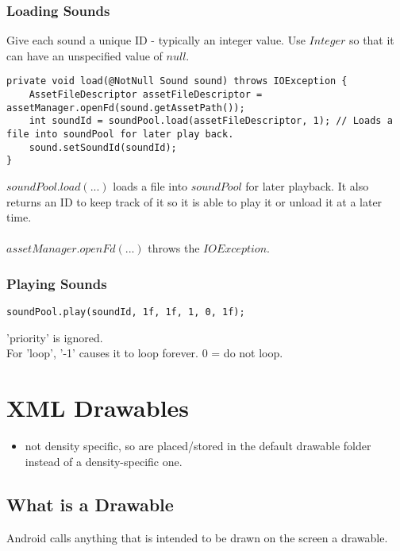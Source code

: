 \documentclass[]{article}
\begin{document}
\subsubsection{Loading Sounds}
Give each sound a unique ID - typically an integer value.  Use $Integer$ so that it can have an unspecified value of $null$.
\begin{lstlisting}
private void load(@NotNull Sound sound) throws IOException {
	AssetFileDescriptor assetFileDescriptor = assetManager.openFd(sound.getAssetPath());
	int soundId = soundPool.load(assetFileDescriptor, 1); // Loads a file into soundPool for later play back.
	sound.setSoundId(soundId);
}
\end{lstlisting}
$soundPool.load(...)$ loads a file into $soundPool$ for later playback.  It also returns an ID to keep track of it so it is able to play it or unload it at a later time.
\\\\
$assetManager.openFd(...)$ throws the $IOException$.

\subsubsection{Playing Sounds}
\begin{lstlisting}
soundPool.play(soundId, 1f, 1f, 1, 0, 1f);
\end{lstlisting}
'priority' is ignored.
\\
For 'loop', '-1' causes it to loop forever.  0 = do not loop.

\section{XML Drawables}
\begin{itemize}
	\item not density specific, so are placed/stored in the default drawable folder instead of a density-specific one.
\end{itemize}
\subsection{What is a Drawable}
Android calls anything that is intended to be drawn on the screen a drawable.
\end{document}
